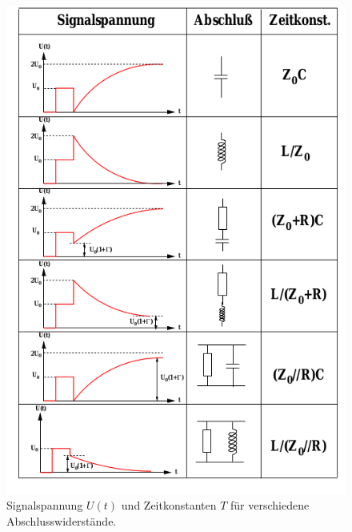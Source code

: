 \documentclass[
	11pt,
	a4paper,
	fleqn,
	ngerman,
	parskip,
	toc=bibliography
]{scrartcl}
\begin{document}
\begin{figure}[htpb]
  \centering
  \includegraphics[scale=0.6]{bilder/abschluss.png}
  \caption{Signalspannung $U(t)$ und Zeitkonstanten $T$ für verschiedene
  Abschlusswiderstände.}
  \label{fig:abschluesse}
\end{figure}



\end{document}
